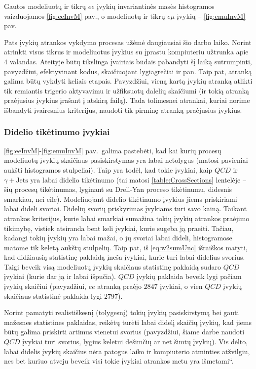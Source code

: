 \documentclass[a4paper, 12pt]{article}
\newcommand{\gJets}{\gamma\! +\!\mathrm{Jets}}
\newcommand{\ltq}[1]{{\quotedblbase{}#1\textquotedblleft{}}}
\newcommand{\QCD}{QC\! D}
\newlength\q
\begin{document}
Gautos modeliuotų ir tikrų $ee$ įvykių invariantinės masės histogramos vaizduojamos \ref{fig:eeInvM} pav., o modeliuotų ir tikrų $e\mu$ įvykių -- \ref{fig:emuInvM} pav.

Pats įvykių atrankos vykdymo procesas užėmė daugiausiai šio darbo laiko. Norint atrinkti visus tikrus ir modeliuotus įvykius su įprastu kompiuteriu užtrunka apie $4$ valandas. Ateityje būtų tikslinga įvairiais būdais pabandyti šį laiką sutrumpinti, pavyzdžiui, efektyvinant kodus, skaičiuojant lygiagrečiai ir pan. Taip pat, atranką galima būtų vykdyti keliais etapais. Pavyzdžiui, vieną kartą įvykių atranką atlikti tik remiantis trigerio aktyvavimu ir užfiksuotų dalelių skaičiumi (ir tokią atranką praėjusius įvykius įrašant į atskirą failą). Tada tolimesnei atrankai, kuriai norime išbandyti įvairesnius kriterijus, naudoti tik pirminę atranką praėjusius įvykius.

\subsubsection{Didelio tikėtinumo įvykiai}

\ref{fig:eeInvM}-\ref{fig:emuInvM} pav.\ galima pastebėti, kad kai kurių procesų modeliuotų įvykių skaičiaus pasiskirstymas yra labai netolygus (matosi pavieniai aukšti histogramos stulpeliai). Taip yra todėl, kad tokie įvykiai, kaip $\QCD$ ir $\gJets$ yra labai didelio tikėtinumo (tai matosi \ref{table:CrossSections} lentelėje -- šių procesų tikėtinumas, lyginant su Drell-Yan proceso tikėtinumu, didesnis smarkiau, nei eile). Modeliuojant didelio tikėtinumo įvykius jiems priskiriami labai dideli svoriai. Didelių svorių priskyrimas įvykiams turi savo kainą. Taikant atrankos kriterijus, kurie labai smarkiai sumažina tokių įvykių atrankos praėjimo tikimybę, vistiek atsiranda bent keli įvykiai, kurie sugeba ją praeiti. Tačiau, kadangi tokių įvykių yra labai mažai, o jų svoriai labai dideli, histogramose matome tik keletą aukštų stulpelių. Taip pat, iš \eqref{eq:w2sumUnc} išraiškos matyti, kad didžiausią statistinę paklaidą įneša įvykiai, kurie turi labai didelius svorius. Taigi beveik visą modeliuotų įvykių skaičiaus statistinę paklaidą sudaro $\QCD$ įvykiai (kurie dar ją ir labai išpučia). $\QCD$ įvykių paklaida beveik lygi pačiam įvykių skaičiui (pavyzdžiui, $ee$ atranką praėjo $2847$ įvykiai, o vien $\QCD$ įvykių skaičiaus statistinė paklaida lygi $2797$).

Norint pamatyti realistiškesnį (tolygesnį) tokių įvykių pasiskirstymą bei gauti mažesnes statistines paklaidas, reikėtų turėti labai didelį skaičių įvykių, kad jiems būtų galima priskirti artimus vienetui svorius (pavyzdžiui, šiame darbe naudoti $\QCD$ įvykiai turi svorius, lygius keletui dešimčių ar net šimtų įvykių). Vis dėlto, labai didelis įvykių skaičius nėra patogus laiko ir kompiuterio atminties atžvilgiu, nes bet kuriuo atveju beveik visi tokie įvykiai atrankos metu yra \ltq{išmetami}.
\end{document}
